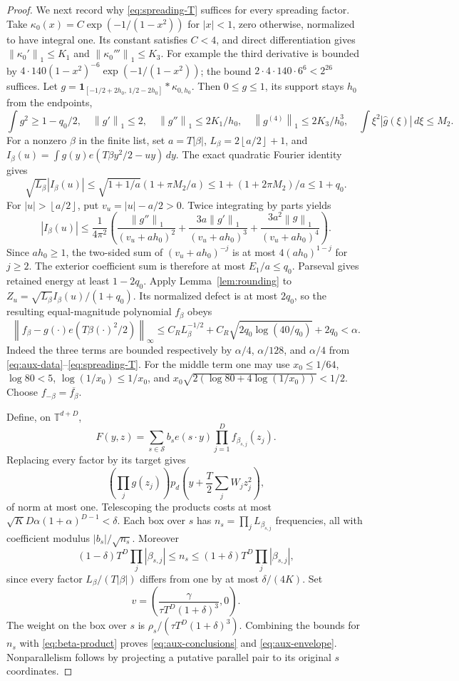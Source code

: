 \documentclass[11pt]{article}
\theoremstyle{remark}
\newcommand{\T}{\mathbb T}
\newcommand{\floor}[1]{\left\lfloor #1\right\rfloor}
\newcommand{\norm}[1]{\left\|#1\right\|}
\begin{document}
\begin{proof}
We next record why \eqref{eq:spreading-T} suffices for every spreading
factor. Take $\kappa_0(x)=C\exp(-1/(1-x^2))$ for $|x|<1$, zero otherwise,
normalized to have integral one. Its constant satisfies $C<4$, and direct
differentiation gives
$\norm{\kappa_0'}_1\le K_1$ and $\norm{\kappa_0'''}_1\le K_3$.
For example the third derivative is bounded by
$4\cdot140(1-x^2)^{-6}\exp(-1/(1-x^2))$; the bound
$2\cdot4\cdot140\cdot6^6<2^{26}$ suffices.
Let $g=\mathbf1_{[-1/2+2h_0,\,1/2-2h_0]}*\kappa_{0,h_0}$.
Then $0\le g\le1$, its support stays $h_0$ from the endpoints,
\[
 \int g^2\ge1-q_0/2,\quad
 \norm{g'}_1\le2,\quad\norm{g''}_1\le2K_1/h_0,
 \quad\norm{g^{(4)}}_1\le2K_3/h_0^3,
 \quad\int\xi^2|\widehat g(\xi)|\,d\xi\le M_2.
\]
For a nonzero $\beta$ in the finite list, set $a=T|\beta|$,
$L_\beta=2\floor{a/2}+1$, and
$I_\beta(u)=\int g(y)e(T\beta y^2/2-uy)\,dy$.
The exact quadratic Fourier identity gives
\[
 \sqrt{L_\beta}|I_\beta(u)|
 \le\sqrt{1+1/a}(1+\pi M_2/a)
 \le1+(1+2\pi M_2)/a\le1+q_0.
\]
For $|u|>\floor{a/2}$, put $v_u=|u|-a/2>0$.
Twice integrating by parts yields
\[
 |I_\beta(u)|\le\frac1{4\pi^2}
 \left(\frac{\norm{g''}_1}{(v_u+ah_0)^2}
 +\frac{3a\norm{g'}_1}{(v_u+ah_0)^3}
 +\frac{3a^2\norm g_1}{(v_u+ah_0)^4}\right).
\]
Since $ah_0\ge1$, the two-sided sum of $(v_u+ah_0)^{-j}$ is at most
$4(ah_0)^{1-j}$ for $j\ge2$. The exterior coefficient sum is therefore
at most $E_1/a\le q_0$. Parseval gives retained energy at least $1-2q_0$.
Apply Lemma~\ref{lem:rounding} to
$Z_u=\sqrt{L_\beta}I_\beta(u)/(1+q_0)$. Its normalized defect is at
most $2q_0$, so the resulting equal-magnitude polynomial $f_\beta$ obeys
\[
 \norm{f_\beta-g(\cdot)e(T\beta(\cdot)^2/2)}_\infty
 \le C_RL_\beta^{-1/2}
      +C_R\sqrt{2q_0\log(40/q_0)}+2q_0<\alpha.
\]
Indeed the three terms are bounded respectively by
$\alpha/4$, $\alpha/128$, and $\alpha/4$ from
\eqref{eq:aux-data}--\eqref{eq:spreading-T}. For the middle term one may
use $x_0\le1/64$, $\log80<5$, $\log(1/x_0)\le1/x_0$, and
$x_0\sqrt{2(\log80+4\log(1/x_0))}<1/2$.
Choose $f_{-\beta}=\overline{f_\beta}$.

Define, on $\T^{d+D}$,
\[
 F(y,z)=\sum_{s\in\mathcal S}b_se(s\cdot y)
                       \prod_{j=1}^D f_{\beta_{s,j}}(z_j).
\]
Replacing every factor by its target gives
\[
 \left(\prod_jg(z_j)\right)
 p_d\left(y+\frac T2\sum_jW_jz_j^2\right),
\]
of norm at most one. Telescoping the products costs at most
$\sqrt K D\alpha(1+\alpha)^{D-1}<\delta$.
Each box over $s$ has $n_s=\prod_jL_{\beta_{s,j}}$ frequencies, all with
coefficient modulus $|b_s|/\sqrt{n_s}$. Moreover
\[
 (1-\delta)T^D\prod_j|\beta_{s,j}|
 \le n_s\le(1+\delta)T^D\prod_j|\beta_{s,j}|,
\]
since every factor $L_\beta/(T|\beta|)$ differs from one by at most
$\delta/(4K)$. Set
\[
 v=\left(\frac{\gamma}{\tau T^D(1+\delta)^3},0\right).
\]
The weight on the box over $s$ is
$\rho_s/(\tau T^D(1+\delta)^3)$. Combining the bounds for $n_s$ with
\eqref{eq:beta-product} proves \eqref{eq:aux-conclusions} and
\eqref{eq:aux-envelope}. Nonparallelism follows by projecting a putative
parallel pair to its original $s$ coordinates.
\end{proof}
\end{document}
